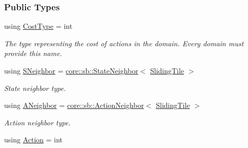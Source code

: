 \subsubsection*{Public Types}
\begin{DoxyCompactItemize}
\item 
using \hyperlink{structslb_1_1ext_1_1domain_1_1sliding__tile_1_1SlidingTile_aba79ace10810220595709f1f0d50d710}{Cost\+Type} = int\hypertarget{structslb_1_1ext_1_1domain_1_1sliding__tile_1_1SlidingTile_aba79ace10810220595709f1f0d50d710}{}\label{structslb_1_1ext_1_1domain_1_1sliding__tile_1_1SlidingTile_aba79ace10810220595709f1f0d50d710}

\begin{DoxyCompactList}\small\item\em The type representing the cost of actions in the domain. Every domain must provide this name. \end{DoxyCompactList}\item 
using \hyperlink{structslb_1_1ext_1_1domain_1_1sliding__tile_1_1SlidingTile_a8b2f287fea14ab7e8afaf37e63b5257d}{S\+Neighbor} = \hyperlink{structslb_1_1core_1_1sb_1_1StateNeighbor}{core\+::sb\+::\+State\+Neighbor}$<$ \hyperlink{structslb_1_1ext_1_1domain_1_1sliding__tile_1_1SlidingTile}{Sliding\+Tile} $>$\hypertarget{structslb_1_1ext_1_1domain_1_1sliding__tile_1_1SlidingTile_a8b2f287fea14ab7e8afaf37e63b5257d}{}\label{structslb_1_1ext_1_1domain_1_1sliding__tile_1_1SlidingTile_a8b2f287fea14ab7e8afaf37e63b5257d}

\begin{DoxyCompactList}\small\item\em State neighbor type. \end{DoxyCompactList}\item 
using \hyperlink{structslb_1_1ext_1_1domain_1_1sliding__tile_1_1SlidingTile_ad70d129acaffb4db0b286870379cd047}{A\+Neighbor} = \hyperlink{structslb_1_1core_1_1sb_1_1ActionNeighbor}{core\+::sb\+::\+Action\+Neighbor}$<$ \hyperlink{structslb_1_1ext_1_1domain_1_1sliding__tile_1_1SlidingTile}{Sliding\+Tile} $>$\hypertarget{structslb_1_1ext_1_1domain_1_1sliding__tile_1_1SlidingTile_ad70d129acaffb4db0b286870379cd047}{}\label{structslb_1_1ext_1_1domain_1_1sliding__tile_1_1SlidingTile_ad70d129acaffb4db0b286870379cd047}

\begin{DoxyCompactList}\small\item\em Action neighbor type. \end{DoxyCompactList}\item 
using \hyperlink{structslb_1_1ext_1_1domain_1_1sliding__tile_1_1SlidingTile_af40ada89a9d6c41d673e1330f0849ed4}{Action} = int\hypertarget{structslb_1_1ext_1_1domain_1_1sliding__tile_1_1SlidingTile_af40ada89a9d6c41d673e1330f0849ed4}{}\label{structslb_1_1ext_1_1domain_1_1sliding__tile_1_1SlidingTile_af40ada89a9d6c41d673e1330f0849ed4}


\end{DoxyCompactItemize}
